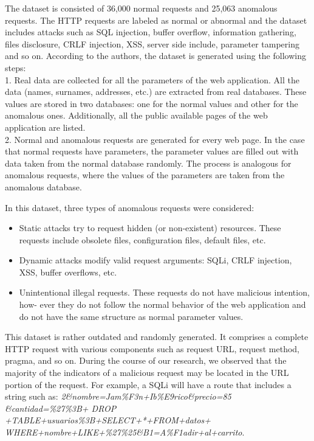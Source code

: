 The dataset is consisted of 36,000 normal requests and 25,063 anomalous requests. The HTTP requests are labeled as normal or abnormal and the dataset includes attacks such as SQL injection, buffer overflow, information gathering, files disclosure, CRLF injection, XSS, server side include, parameter tampering and so on. 
According to the authors, the dataset is generated using the following steps: \\ 
1.	Real data are collected for all the parameters of the web application. All the data (names, surnames, addresses, etc.) are extracted from real databases. These values are stored in two databases: one for the normal values and other for the anomalous ones. Additionally, all the public available pages of the web application are listed. \\
2.	Normal and anomalous requests are generated for every web page. In the case that normal requests have parameters, the parameter values are filled out with data taken from the normal database randomly. The process is analogous for anomalous requests, where the values of the parameters are taken from the anomalous database. 

In this dataset, three types of anomalous requests were considered: 
\begin{itemize}
	\item Static attacks try to request hidden (or non-existent) resources. These requests include obsolete files, configuration files, default files, etc. 
	\item Dynamic attacks modify valid request arguments: SQLi, CRLF injection, XSS, buffer overflows, etc.
	\item Unintentional illegal requests. These requests do not have malicious intention, how- ever they do not follow the normal behavior of the web application and do not have the same structure as normal parameter values.
\end{itemize}

This dataset is rather outdated and randomly generated.  It comprises a complete HTTP request with various components such as request URL, request method, pragma, and so on. During the course of our research, we observed that the majority of the indicators of a malicious request may be located in the URL portion of the request. For example, a SQLi will have a route that includes a string such as: \textit{2\&nombre=Jam\%F3n+Ib\%E9rico\&precio=85 \\ \&cantidad=\%27\%3B+  DROP +TABLE+usuarios\%3B+SELECT+*+FROM+datos+ \\ WHERE+nombre+LIKE+\%27\%25\&B1=A\%F1adir+al+carrito}.

